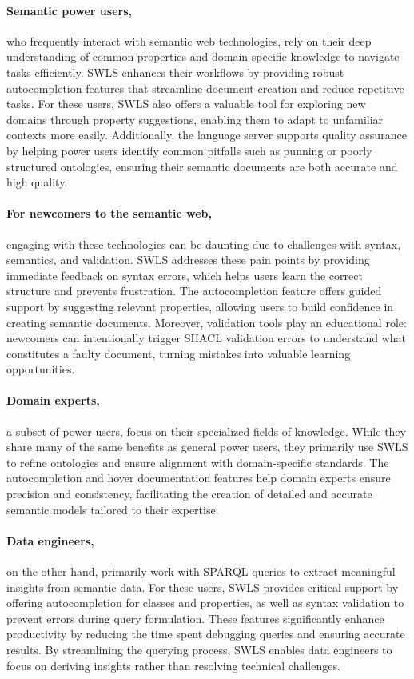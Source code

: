 \paragraph{Semantic power users,} who frequently interact with semantic web technologies, rely on their deep understanding of common properties and domain-specific knowledge to navigate tasks efficiently.
SWLS enhances their workflows by providing robust autocompletion features that streamline document creation and reduce repetitive tasks.
For these users, SWLS also offers a valuable tool for exploring new domains through property suggestions, enabling them to adapt to unfamiliar contexts more easily. 
Additionally, the language server supports quality assurance by helping power users identify common pitfalls such as punning or poorly structured ontologies, ensuring their semantic documents are both accurate and high quality.

\paragraph{For newcomers to the semantic web,} engaging with these technologies can be daunting due to challenges with syntax, semantics, and validation. 
SWLS addresses these pain points by providing immediate feedback on syntax errors, which helps users learn the correct structure and prevents frustration.
The autocompletion feature offers guided support by suggesting relevant properties, allowing users to build confidence in creating semantic documents.
Moreover, validation tools play an educational role: newcomers can intentionally trigger SHACL validation errors to understand what constitutes a faulty document,
turning mistakes into valuable learning opportunities.

\paragraph{Domain experts,} a subset of power users, focus on their specialized fields of knowledge. 
While they share many of the same benefits as general power users, they primarily use SWLS to refine ontologies and ensure alignment with domain-specific standards. 
The autocompletion and hover documentation features help domain experts ensure precision and consistency, facilitating the creation of detailed and accurate semantic models tailored to their expertise.

\paragraph{Data engineers,} on the other hand, primarily work with SPARQL queries to extract meaningful insights from semantic data. 
For these users, SWLS provides critical support by offering autocompletion for classes and properties, as well as syntax validation to prevent errors during query formulation. 
These features significantly enhance productivity by reducing the time spent debugging queries and ensuring accurate results. 
By streamlining the querying process, SWLS enables data engineers to focus on deriving insights rather than resolving technical challenges.



